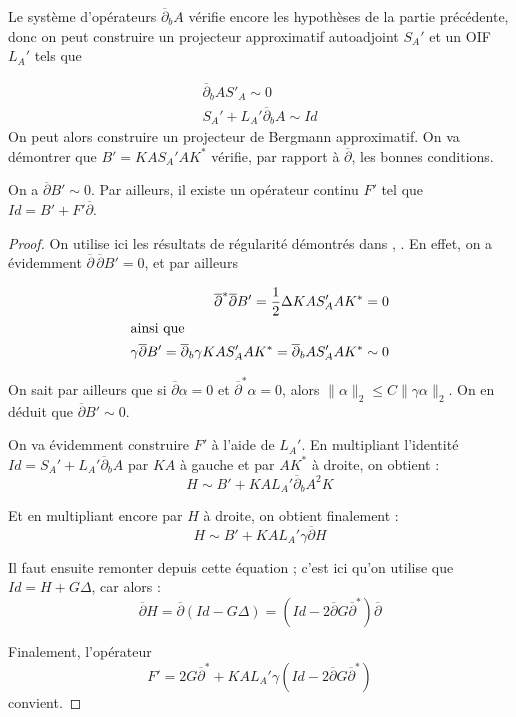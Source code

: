 Le système d'opérateurs $\overline{\partial}_bA$ vérifie encore les hypothèses de la partie précédente, donc on peut construire un projecteur approximatif autoadjoint $S_A'$ et un OIF $L_A'$ tels que
 
\begin{align*}
  \overline{\partial}_bAS'_A\sim 0\\
  S_A' + L_A'\overline{\partial}_bA\sim Id
\end{align*}
On peut alors construire un projecteur de Bergmann approximatif. On va démontrer que $B' = KAS_A'AK^*$ vérifie, par rapport à $\overline{\partial}$, les bonnes conditions.
\begin{lem}
On a $\overline{\partial}B' \sim 0$. Par ailleurs, il existe un opérateur continu $F'$ tel que $Id=B'+F'\overline{\partial}$.
\end{lem}
\begin{proof}
On utilise ici les résultats de régularité démontrés dans \cite{kohn1963harmonic}, \cite{kohn1964harmonic}. En effet, on a évidemment $\overline{\partial}\,\overline{\partial}B'=0$, et par ailleurs 

\begin{align*}
  \overline{\partial}^*\overline{\partial}B' = \frac{1}{2} \Delta KAS_A'AK^* = 0\\
  \intertext{ainsi que}
  \gamma \overline{\partial} B' = \overline{\partial}_b\gamma KAS_A'AK^* = \overline{\partial}_bAS_A'AK^* \sim 0
\end{align*}

\noindent On sait par ailleurs que si $\overline{\partial}\alpha=0$ et $\overline{\partial}^*\alpha =0$, alors $\|\alpha\|_2 \leq C\|\gamma \alpha\|_2$. On en déduit que $\overline{\partial}B' \sim 0$.

On va évidemment construire $F'$ à l'aide de $L_A'$. En multipliant l'identité $Id = S_A' + L_A'\overline{\partial}_bA$ par $KA$ à gauche et par $AK^*$ à droite, on obtient :
\begin{equation*}
  H \sim B' + KAL_A'\overline{\partial}_bA^2K
\end{equation*}

\noindent Et en multipliant encore par $H$ à droite, on obtient finalement :
\begin{equation*}
  H \sim B' + KAL_A'\gamma\overline{\partial}H
\end{equation*}

\noindent Il faut ensuite remonter depuis cette équation ; c'est ici qu'on utilise que $Id=H+G\Delta$, car alors :
\begin{equation*}
  \overline{\partial}H = \overline{\partial}(Id-G\Delta) = (Id - 2\overline{\partial}G\overline{\partial}^*)\overline{\partial}
\end{equation*}

\noindent Finalement, l'opérateur 
\begin{equation*}
  F' = 2G\overline{\partial}^* + KAL_A'\gamma(Id-2\overline{\partial}G\overline{\partial}^*)
\end{equation*}
\noindent convient.
\end{proof}

